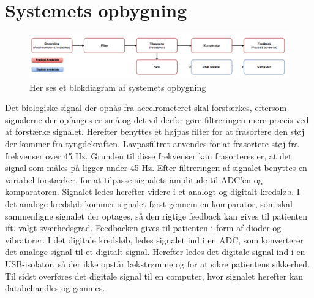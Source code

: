 \section{Systemets opbygning}
\begin{figure}[H]
\centering
\includegraphics[scale=0.5]{figures/Blokdiagram.jpg}
\caption{Her ses et blokdiagram af systemets opbygning}
\label{Blokdiagram}
\end{figure}

Det biologiske signal der opnås fra accelrometeret skal forstærkes, eftersom signalerne der opfanges er små og det vil derfor gøre filtreringen mere præcis ved at forstærke signalet. Herefter benyttes et højpas filter for at frasortere den støj der kommer fra tyngdekraften.  Lavpasfiltret anvendes for at frasortere støj fra frekvenser over 45 Hz. Grunden til disse frekvenser kan frasorteres er, at det signal som måles på ligger under 45 Hz. Efter filtreringen af signalet benyttes en variabel forstærker, for at tilpasse signalets amplitude til ADC’en og komparatoren. Signalet ledes herefter videre i et analogt og digitalt kredsløb. I det analoge kredsløb kommer signalet først gennem en komparator, som skal sammenligne signalet der optages, så den rigtige feedback kan gives til patienten ift. valgt sværhedsgrad. Feedbacken gives til patienten i form af dioder og vibratorer. I det digitale kredsløb, ledes signalet ind i en ADC, som konverterer det analoge signal til et digitalt signal. Herefter ledes det digitale signal ind i en USB-isolator, så der ikke opstår lækstrømme og for at sikre patientens sikkerhed. Til sidst overføres det digitale signal til en computer, hvor signalet herefter kan databehandles og gemmes.


